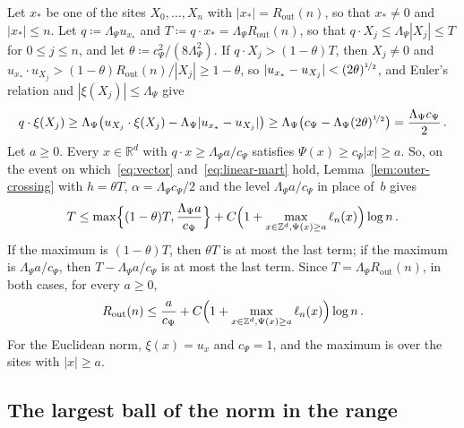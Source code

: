 \documentclass[11pt]{amsart}
\theoremstyle{plain}
\theoremstyle{definition}
\newcommand{\Z}{\mathbb Z}
\newcommand{\R}{\mathbb R}
\newcommand{\gauge}{\Psi}
\newcommand{\nf}{\nicefrac}
\newcommand{\Rout}{R_{\mathrm{out}}}
\numberwithin{equation}{section}
\begin{document}
Let $x_*$ be one of the sites $X_0,\ldots,X_n$ with $|x_*|=\Rout(n)$, so that $x_*\neq0$ and $|x_*|\leq n$. Let $q\coloneqq\Lambda_\gauge u_{x_*}$ and $T\coloneqq q\cdot x_*=\Lambda_\gauge\Rout(n)$, so that $q\cdot X_j\leq\Lambda_\gauge|X_j|\leq T$ for $0\leq j\leq n$, and let $\theta\coloneqq c_\gauge^2/(8\Lambda_\gauge^2)$. If $q\cdot X_j>(1-\theta)T$, then $X_j\neq0$ and $u_{x_*}\cdot u_{X_j}>(1-\theta)\Rout(n)/|X_j|\geq1-\theta$, so $|u_{x_*}-u_{X_j}|<(2\theta)^{\nf12}$, and Euler's relation and $|\xi(X_j)|\leq\Lambda_\gauge$ give
\begin{equation*}
q\cdot\xi(X_j)\geq\Lambda_\gauge\bigl(u_{X_j}\cdot\xi(X_j)-\Lambda_\gauge|u_{x_*}-u_{X_j}|\bigr)\geq\Lambda_\gauge\bigl(c_\gauge-\Lambda_\gauge(2\theta)^{\nf12}\bigr)=\frac{\Lambda_\gauge c_\gauge}{2}\, .
\end{equation*}
Let $a\geq0$. Every $x\in\R^d$ with $q\cdot x\geq\Lambda_\gauge a/c_\gauge$ satisfies $\gauge(x)\geq c_\gauge|x|\geq a$. So, on the event on which~\eqref{eq:vector} and~\eqref{eq:linear-mart} hold, Lemma~\ref{lem:outer-crossing} with $h=\theta T$, $\alpha=\Lambda_\gauge c_\gauge/2$ and the level $\Lambda_\gauge a/c_\gauge$ in place of~$b$ gives
\begin{equation*}
T\leq\max\Bigl\{(1-\theta)T,\frac{\Lambda_\gauge a}{c_\gauge}\Bigr\}+C\Bigl(1+\max_{x\in\Z^d,\gauge(x)\geq a}\ell_n(x)\Bigr)\log n\, .
\end{equation*}
If the maximum is $(1-\theta)T$, then $\theta T$ is at most the last term; if the maximum is $\Lambda_\gauge a/c_\gauge$, then $T-\Lambda_\gauge a/c_\gauge$ is at most the last term. Since $T=\Lambda_\gauge\Rout(n)$, in both cases, for every $a\geq0$,
\begin{equation}\label{eq:euclid-crossing}
\Rout(n)\leq\frac a{c_\gauge}+C\Bigl(1+\max_{x\in\Z^d,\gauge(x)\geq a}\ell_n(x)\Bigr)\log n\, .
\end{equation}
For the Euclidean norm, $\xi(x)=u_x$ and $c_\gauge=1$, and the maximum is over the sites with $|x|\geq a$.

\subsection{The largest ball of the norm in the range}\label{sec:largest-ball}
\end{document}
